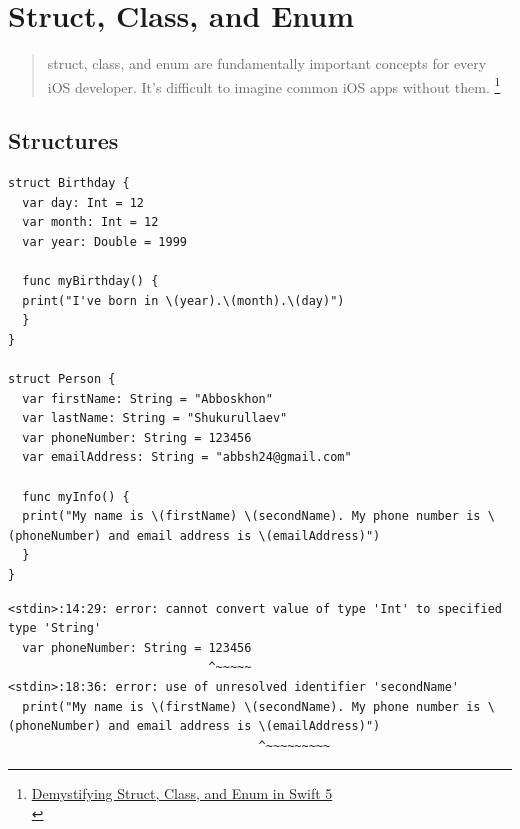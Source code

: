 \documentclass[a4paper,12pt]{article}
\begin{document}
\section{Struct, Class, and Enum}
\label{sec:orgd17c297}
\begin{verse}
struct, class, and enum are fundamentally important concepts for every iOS developer. It’s difficult to imagine common iOS apps without them. \footnote{\href{https://levelup.gitconnected.com/demystifying-struct-class-and-enum-in-swift-5-43dde089e96a}{Demystifying Struct, Class, and Enum in Swift 5}\\\label{orgbf6fe03}}\\
\end{verse}
\subsection{Structures}
\label{sec:org8b7cdbf}
\lstset{breaklines=true,language=swift,label= ,caption= ,captionpos=b,firstnumber=1,numbers=left}
\begin{lstlisting}
struct Birthday {
  var day: Int = 12
  var month: Int = 12
  var year: Double = 1999

  func myBirthday() {
  print("I've born in \(year).\(month).\(day)")
  }
}

struct Person {
  var firstName: String = "Abboskhon"
  var lastName: String = "Shukurullaev"
  var phoneNumber: String = 123456
  var emailAddress: String = "abbsh24@gmail.com"

  func myInfo() {
  print("My name is \(firstName) \(secondName). My phone number is \(phoneNumber) and email address is \(emailAddress)")
  }
}
\end{lstlisting}

\begin{verbatim}
<stdin>:14:29: error: cannot convert value of type 'Int' to specified type 'String'
  var phoneNumber: String = 123456
                            ^~~~~~
<stdin>:18:36: error: use of unresolved identifier 'secondName'
  print("My name is \(firstName) \(secondName). My phone number is \(phoneNumber) and email address is \(emailAddress)")
                                   ^~~~~~~~~~
\end{verbatim}
\end{document}
